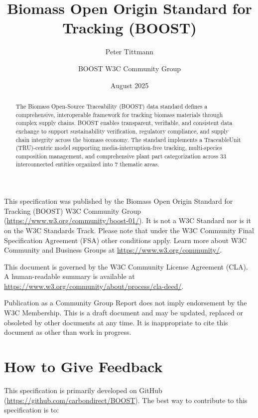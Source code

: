 \documentclass[12pt,a4paper]{article}
\title{Biomass Open Origin Standard for Tracking (BOOST)}
\author{Peter Tittmann \and BOOST W3C Community Group}
\date{August 2025}
\begin{document}

\boosttitle


\newpage
{}

\begin{abstract}
The Biomass Open-Source Traceability (BOOST) data standard defines a comprehensive, interoperable framework for tracking biomass materials through complex supply chains. BOOST enables transparent, verifiable, and consistent data exchange to support sustainability verification, regulatory compliance, and supply chain integrity across the biomass economy. The standard implements a TraceableUnit (TRU)-centric model supporting media-interruption-free tracking, multi-species composition management, and comprehensive plant part categorization across 33 interconnected entities organized into 7 thematic areas.
\end{abstract}

\begin{w3cstatus}
This specification was published by the Biomass Open Origin Standard for Tracking (BOOST) W3C Community Group (\url{https://www.w3.org/community/boost-01/}). It is not a W3C Standard nor is it on the W3C Standards Track. Please note that under the W3C Community Final Specification Agreement (FSA) other conditions apply. Learn more about W3C Community and Business Groups at \url{https://www.w3.org/community/}.

This document is governed by the W3C Community License Agreement (CLA). A human-readable summary is available at \url{https://www.w3.org/community/about/process/cla-deed/}.

Publication as a Community Group Report does not imply endorsement by the W3C Membership. This is a draft document and may be updated, replaced or obsoleted by other documents at any time. It is inappropriate to cite this document as other than work in progress.
\end{w3cstatus}

\section*{How to Give Feedback}
This specification is primarily developed on GitHub (\url{https://github.com/carbondirect/BOOST}). The best way to contribute to this specification is to:
\end{document}
